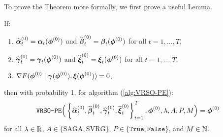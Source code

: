 To prove the Theorem more formally, we first prove a useful Lemma.

\begin{lemma}
    If:
    \begin{enumerate}
        \item $\widehat {\boldsymbol{\alpha}}^{(0)}_t = \boldsymbol{\alpha}_t(\boldsymbol{\phi}^{(0)})$ and $\widehat {\boldsymbol{\beta}}^{(0)}_{t} = \boldsymbol{\beta}_t(\boldsymbol{\phi}^{(0)})$ for all $t = 1,\ldots,T$,
        \item $\widehat {\boldsymbol{\gamma}}^{(0)}_{t} = \boldsymbol{\gamma}_t(\boldsymbol{\phi}^{(0)})$ and $\widehat {\boldsymbol{\xi}}^{(0)}_{t} = \boldsymbol{\xi}_t(\boldsymbol{\phi}^{(0)})$ for all $t = 1,\ldots,T$,
        \item $\nabla F(\boldsymbol{\phi}^{(0)} \mid \boldsymbol{\gamma}(\boldsymbol{\phi}^{(0)}),\boldsymbol{\xi}(\boldsymbol{\phi}^{(0)})) = 0$,
    \end{enumerate}
    then with probability 1, for algorithm (\ref{alg:VRSO-PE}):
    \begin{equation}
        \texttt{VRSO-PE}\Big(\left\{\widehat {\boldsymbol{\alpha}}_t^{(0)},\widehat {\boldsymbol{\beta}}_t^{(0)},\widehat {\boldsymbol{\gamma}}_t^{(0)},\widehat {\boldsymbol{\xi}}_t^{(0)}\right\}_{t=1}^T, \boldsymbol{\phi}^{(0)}, \lambda, A, P, M \Big) = \boldsymbol{\phi}^{(0)}
    \end{equation}
    for all $\lambda \in \mathbb{R}$, $A \in \{\text{SAGA}, \text{SVRG}\}$, $P \in \{\texttt{True},\texttt{False}\}$, and $M \in \mathbb{N}$.
\end{lemma}


